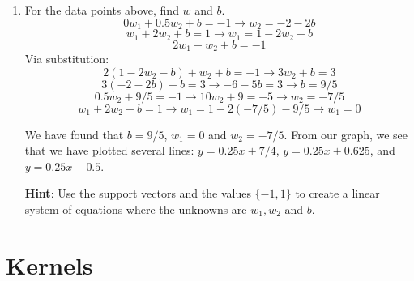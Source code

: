 \documentclass{article}
\begin{document}
\begin{aprob}
\begin{enumerate}
        
        \item {} For the data points above, find $w$ and $b$. \\
        
        \begin{equation*}
        0 w_1 + 0.5 w_2 + b = -1 \rightarrow w_2 = -2 - 2b
        \end{equation*}
        \begin{equation*}
        w_1 + 2 w_2 + b = 1 \rightarrow w_1 = 1 - 2 w_2 - b
        \end{equation*}
        \begin{equation*}
        2 w_1 + w_2 + b = -1
        \end{equation*}
        Via substitution:
        \begin{equation*}
        2(1 - 2 w_2 - b) + w_2 + b = -1 \rightarrow 3 w_2 + b = 3
        \end{equation*}
        \begin{equation*}
        3(-2 - 2b) + b = 3 \rightarrow -6 - 5b = 3 \rightarrow b = 9/5
        \end{equation*}
        \begin{equation*}
        0.5 w_2 + 9/5 = -1 \rightarrow 10 w_2 + 9 = -5 \rightarrow w_2 = -7/5
        \end{equation*}
        \begin{equation*}
        w_1 + 2 w_2 + b = 1 \rightarrow w_1 = 1 - 2(-7/5) - 9/5 \rightarrow w_1 = 0
        \end{equation*}
        
        We have found that $b = 9/5$, $w_1 = 0$ and $w_2 = -7/5$. From our graph, we see that we have plotted several lines: $y = 0.25x + 7/4$, $y = 0.25x + 0.625$, and $y = 0.25x + 0.5$.
        
        \textbf{Hint}: Use the support vectors and the values $\{-1, 1\}$ to create a linear system of equations where the unknowns are $w_1, w_2$ and $b$.
    
    \end{enumerate}
\end{aprob}

\section*{Kernels}
\end{document}

